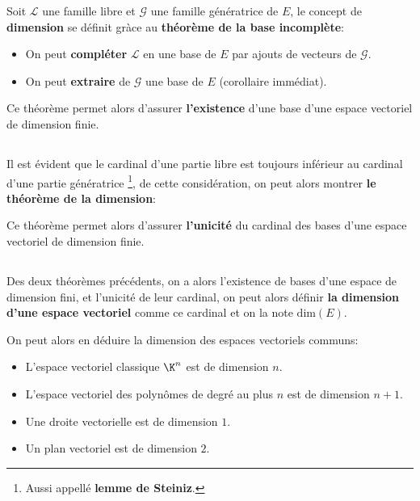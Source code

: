 Soit \(\mathcal{L}\) une famille libre et \(\mathcal{G}\) une famille génératrice de \(E\), le concept de \textbf{dimension} se définit gràce au \textbf{théorème de la base incomplète}:
\begin{itemize}
   \item On peut \textbf{compléter} \(\mathcal{L}\) en une base de \(E\) par ajouts de vecteurs de \(\mathcal{G}\).
   \item On peut \textbf{extraire} de \(\mathcal{G}\) une base de \(E\) (corollaire immédiat).
\end{itemize}
Ce théorème permet alors d'assurer \textbf{l'existence} d'une base d'une espace vectoriel de dimension finie.

\subsection*{}

Il est évident que le cardinal d'une partie libre est toujours inférieur au cardinal d'une partie génératrice \footnote[1]{Aussi appellé \textbf{lemme de Steiniz}.}, de cette considération, on peut alors montrer \textbf{le théorème de la dimension}:
\begin{center}
\end{center}
Ce théorème permet alors d'assurer \textbf{l'unicité} du cardinal des bases d'une espace vectoriel de dimension finie.

\subsection*{}

Des deux théorèmes précédents, on a alors l'existence de bases d'une espace de dimension fini, et l'unicité de leur cardinal, on peut alors définir \textbf{la dimension d'une espace vectoriel} comme ce cardinal et on la note \(\text{dim}(E)\).\<

On peut alors en déduire la dimension des espaces vectoriels communs:
\begin{itemize}
   \item L'espace vectoriel classique \(\K^n\) est de dimension \(n\).
   \item L'espace vectoriel des polynômes de degré au plus \(n\) est de dimension \(n + 1\).
   \item Une droite vectorielle est de dimension \(1\).
   \item Un plan vectoriel est de dimension \(2\).
\end{itemize}

